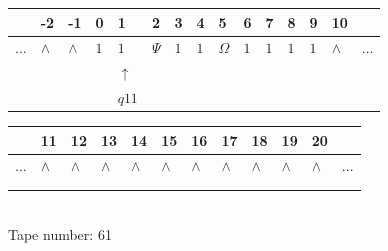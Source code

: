 \documentclass[11pt]{article}
\begin{document}
\begin{table}[H]
\centering
\begin{tabular}{lllllllllllllll}
 & -2 & -1 & 0 & 1 & 2 & 3 & 4 & 5 & 6 & 7 & 8 & 9 & 10 & \\
\hline
$...$ & \multicolumn{1}{|l|}{$\wedge$} & \multicolumn{1}{|l|}{$\wedge$} & \multicolumn{1}{|l|}{$1$} & \multicolumn{1}{|l|}{$1$} & \multicolumn{1}{|l|}{$\Psi$} & \multicolumn{1}{|l|}{$1$} & \multicolumn{1}{|l|}{$1$} & \multicolumn{1}{|l|}{$\Omega$} & \multicolumn{1}{|l|}{$1$} & \multicolumn{1}{|l|}{$1$} & \multicolumn{1}{|l|}{$1$} & \multicolumn{1}{|l|}{$1$} & \multicolumn{1}{|l|}{$\wedge$} & $...$\\
\hline
&  &  &  & $\uparrow$ &  &  &  &  &  &  &  &  &  &  \\
&  &  &  & $ q11 $ &  &  &  &  &  &  &  &  &  &  \\
\end{tabular}
\begin{tabular}{llllllllllll}
 & 11 & 12 & 13 & 14 & 15 & 16 & 17 & 18 & 19 & 20 & \\
\hline
$...$ & \multicolumn{1}{|l|}{$\wedge$} & \multicolumn{1}{|l|}{$\wedge$} & \multicolumn{1}{|l|}{$\wedge$} & \multicolumn{1}{|l|}{$\wedge$} & \multicolumn{1}{|l|}{$\wedge$} & \multicolumn{1}{|l|}{$\wedge$} & \multicolumn{1}{|l|}{$\wedge$} & \multicolumn{1}{|l|}{$\wedge$} & \multicolumn{1}{|l|}{$\wedge$} & \multicolumn{1}{|l|}{$\wedge$} & $...$\\
\hline
&  &  &  &  &  &  &  &  &  &  &  \\
&  &  &  &  &  &  &  &  &  &  &  \\
\end{tabular}
\\
Tape number: 61
\noindent\makebox[\linewidth]{\hdashrule{\textwidth}{1pt}{1pt}}\end{table}
\end{document}
